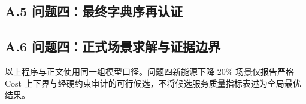 \subsection*{A.5 问题四：最终字典序再认证}


\subsection*{A.6 问题四：正式场景求解与证据边界}






\endgroup

以上程序与正文使用同一组模型口径。问题四新能源下降 20\% 场景仅报告严格 Cost 上下界与经硬约束审计的可行候选，不将候选服务质量指标表述为全局最优结果。
